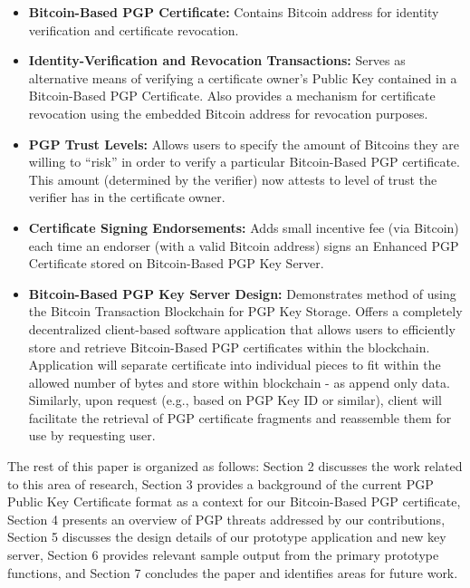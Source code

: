 \documentclass{llncs}
\begin{document}
\begin{itemize}
\item \textbf{Bitcoin-Based PGP Certificate: }  Contains Bitcoin address for identity verification and certificate revocation.   
\item \textbf{Identity-Verification and Revocation Transactions: } Serves as alternative means of verifying a certificate owner's Public Key contained in a Bitcoin-Based PGP Certificate.  Also provides a mechanism for certificate revocation using the embedded Bitcoin address for revocation purposes.
\item \textbf{PGP Trust Levels: } Allows users to specify the
amount of Bitcoins they are willing to ``risk'' in order to verify a particular Bitcoin-Based PGP certificate.  This amount (determined by the verifier) now attests to level of trust the verifier has in the certificate owner. 
\item \textbf{Certificate Signing Endorsements: } Adds small incentive fee (via Bitcoin) each time an endorser (with a valid Bitcoin address) signs an Enhanced PGP Certificate stored on Bitcoin-Based PGP Key Server. 
\item \textbf{Bitcoin-Based PGP Key Server Design: }  Demonstrates method of using the Bitcoin Transaction Blockchain for PGP Key Storage.  Offers a completely decentralized client-based software application that allows users to efficiently store and retrieve Bitcoin-Based PGP certificates within the blockchain.  Application will separate certificate into individual pieces to fit within the allowed number of bytes and store within blockchain - as append only data.  Similarly, upon request (e.g., based on PGP Key ID or similar), client will facilitate the retrieval of PGP certificate fragments and reassemble them for use by requesting user.   
\end{itemize}

The rest of this paper is organized as follows: Section 2 discusses the work related to this area of research, Section 3 provides a background of the current PGP Public Key Certificate format as a context for our Bitcoin-Based PGP certificate, Section 4 presents an overview of PGP threats addressed by our contributions, Section 5 discusses the design details of our prototype application and new key server, Section 6 provides relevant sample output from the primary prototype functions, and Section 7 concludes the paper and identifies areas for future work. 
\end{document}

